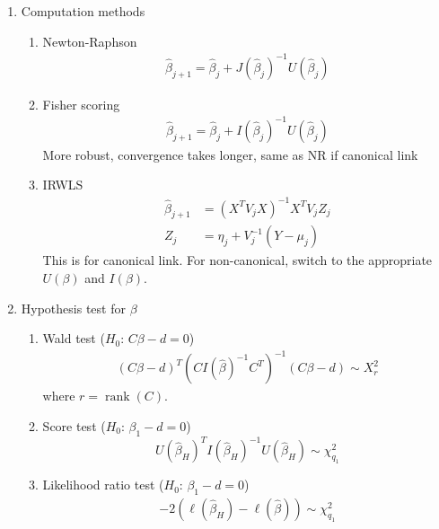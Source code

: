 \documentclass{amsart}
\begin{document}
\begin{enumerate}
\item Computation methods
  \begin{enumerate}
  \item Newton-Raphson
    \begin{align*}
      \hat{\beta}_{j+1} = \hat{\beta}_j + J(\hat{\beta}_j)^{-1} U(\hat{\beta}_j)
    \end{align*}
  \item Fisher scoring
    \begin{align*}
      \hat{\beta}_{j+1} = \hat{\beta}_j + I(\hat{\beta}_j)^{-1} U(\hat{\beta}_j)
    \end{align*}
    More robust, convergence takes longer, same as NR if canonical
    link
  \item IRWLS
    \begin{align*}
      \hat{\beta}_{j+1} & = (X^T V_j X)^{-1} X^T V_j Z_j \\
      Z_j & = \eta_j + V_j^{-1}(Y - \mu_j)
    \end{align*}
    This is for canonical link. For non-canonical, switch to the
    appropriate $U(\beta)$ and $I(\beta)$.


  \end{enumerate}
  
\item Hypothesis test for $\beta$
  \begin{enumerate}
  \item Wald test ($H_0$: $C\beta - d = 0$)
    \begin{align*}
      (C\beta - d)^T (C I(\hat{\beta})^{-1} C^T)^{-1} (C\beta-d) \sim X_r^2
    \end{align*}
    where $r = \operatorname{rank}(C)$.
  \item Score test ($H_0$: $\beta_1 - d = 0$)
    \begin{equation*}
      U(\hat{\beta}_H)^T I(\hat{\beta}_H)^{-1} U(\hat{\beta}_H)
      \sim \chi^2_{q_1}
    \end{equation*}
  \item Likelihood ratio test ($H_0$: $\beta_1 - d = 0$)
    \begin{align*}
      -2 (\ell(\hat{\beta}_H) - \ell(\hat{\beta})) \sim \chi^2_{q_1}
    \end{align*}
  \end{enumerate}


\end{enumerate}
\end{document}

